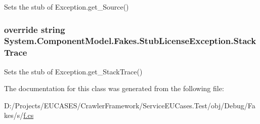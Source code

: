 Sets the stub of Exception.\-get\-\_\-\-Source()

\hypertarget{class_system_1_1_component_model_1_1_fakes_1_1_stub_license_exception_a223313c3eee2c1e40aab904af8fa1ef1}{
\subsubsection[{Stack\-Trace}]{\setlength{\rightskip}{0pt plus 5cm}override string System.\-Component\-Model.\-Fakes.\-Stub\-License\-Exception.\-Stack\-Trace\hspace{0.3cm}{\ttfamily [get]}}}\label{class_system_1_1_component_model_1_1_fakes_1_1_stub_license_exception_a223313c3eee2c1e40aab904af8fa1ef1}


Sets the stub of Exception.\-get\-\_\-\-Stack\-Trace()



The documentation for this class was generated from the following file\-:\begin{DoxyCompactItemize}
\item 
D\-:/\-Projects/\-E\-U\-C\-A\-S\-E\-S/\-Crawler\-Framework/\-Service\-E\-U\-Cases.\-Test/obj/\-Debug/\-Fakes/s/\hyperlink{s_2f_8cs}{f.\-cs}\end{DoxyCompactItemize}
